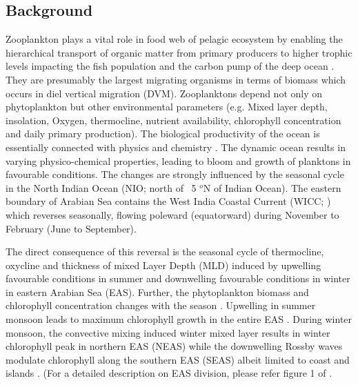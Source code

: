 \documentclass{article}
\begin{document}
	\subsection{Background}
	Zooplankton plays a vital role in food web of pelagic ecosystem by enabling the hierarchical transport of organic matter from primary producers to higher trophic levels impacting the fish population and the carbon pump of the deep ocean \citep{ohman2001density,le2016global}. They are presumably the largest migrating organisms in terms of biomass \citep{hays2003review} which occurs in diel vertical migration (DVM). Zooplanktons depend not only on phytoplankton but other environmental parameters (e.g. Mixed layer depth, insolation, Oxygen, thermocline, nutrient availability, chlorophyll concentration and daily primary production). The biological productivity of the ocean is essentially connected with physics and chemistry \citep{subrahmanyan1959studiespart2, ryther1966primary, qasim1977biological, nair1970primary,banse1995zooplankton,mccreary2009biophysical, vijith2016consequences,amol2020modulation}. The dynamic ocean results in varying physico-chemical properties, leading to bloom and growth of planktons in favourable conditions. The changes are strongly influenced by the seasonal cycle in the North Indian Ocean (NIO; north of ~5 $^o$N of Indian Ocean). The eastern boundary of Arabian Sea contains the West India Coastal Current (WICC; \citep{patil1964hydrography,ramamirtham1965hydrography, banse1968hydrography,shetye1991coastal,mccreary1993numerical, shankar1997dynamics, shetye1998coastal, maheswaran2000upwelling, amol2014observed, chaudhuri2020observed,chaudhuri2021observed}) which reverses seasonally, flowing poleward (equatorward) during November to February (June to September). 
	
	The direct consequence of this reversal is the seasonal cycle of thermocline, oxycline and thickness of mixed Layer Depth (MLD) induced by upwelling favourable conditions in summer and downwelling favourable conditions in winter in eastern Arabian Sea (EAS). Further, the phytoplankton biomass and chlorophyll concentration changes with the season \citep{subrahmanyan1960studies, banse1968hydrography, levy2007basin, vijith2016consequences}. Upwelling in  summer monsoon leads to maximum chlorophyll growth in the entire EAS \citep{ banse1968hydrography, banse2000geographical, mccreary2009biophysical, hood2017biogeochemical}. During winter monsoon, the convective mixing induced winter mixed layer \citep{shetye1992does, madhupratap1996mechanism, levy2007basin, vijith2016consequences, shankar2016inhibition, keerthi2017physical} results in winter chlorophyll peak in northern EAS (NEAS) while the downwelling Rossby waves modulate chlorophyll along the southern EAS (SEAS) albeit limited to coast and islands \citep{amol2020modulation}. (For a detailed description on EAS division, please refer figure 1 of \citep{shankar2019role}.
	
\end{document}

